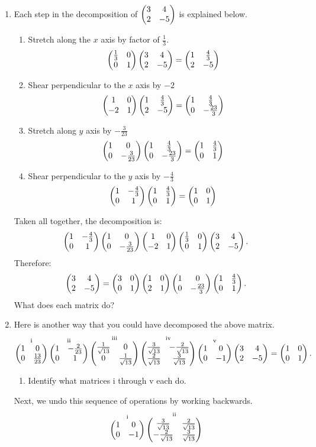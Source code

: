 \documentclass[../gatm_answers.tex]{subfiles}
\begin{document}
\begin{enumerate}
\setcounter{enumi}{\value{problem_i}}
\item \label{prob:needed_for_matrix_undo1}Each step in the decomposition of $\begin{pmatrix} 3 & 4 \\ 2 & -5 \end{pmatrix}$ is explained below.
\begin{multicols}{2}
\begin{enumerate}[label=(\roman*)]
\item Stretch along the $x$ axis by factor of $\frac{1}{3}$.
$$\begin{pmatrix} \frac{1}{3} & 0 \\ 0 & 1 \end{pmatrix}\begin{pmatrix} 3 & 4 \\ 2 & -5 \end{pmatrix}=\begin{pmatrix} 1 & \frac{4}{3} \\ 2 & -5 \end{pmatrix}$$
\item Shear perpendicular to the $x$ axis by $-2$
$$\begin{pmatrix} 1 & 0 \\ -2 & 1 \end{pmatrix}\begin{pmatrix} 1 & \frac{4}{3} \\ 2 & -5 \end{pmatrix}=\begin{pmatrix} 1 & \frac{4}{3} \\ 0 & -\frac{23}{3} \end{pmatrix}$$
\item Stretch along $y$ axis by $-\frac{3}{23}$
$$\begin{pmatrix} 1 & 0 \\ 0 & -\frac{3}{23} \end{pmatrix}\begin{pmatrix} 1 & \frac{4}{3} \\ 0 & -\frac{23}{3} \end{pmatrix}=\begin{pmatrix} 1 & \frac{4}{3} \\ 0 & 1 \end{pmatrix}$$
\item Shear perpendicular to the $y$ axis by $-\frac{4}{3}$
$$\begin{pmatrix} 1 & -\frac{4}{3} \\ 0 & 1 \end{pmatrix}\begin{pmatrix} 1 & \frac{4}{3} \\ 0 & 1 \end{pmatrix}=\begin{pmatrix} 1 & 0 \\ 0 & 1 \end{pmatrix}$$
\end{enumerate}
\end{multicols}
Taken all together, the decomposition is:
$$\begin{pmatrix} 1 & -\frac{4}{3} \\ 0 & 1 \end{pmatrix}\begin{pmatrix} 1 & 0 \\ 0 & -\frac{3}{23} \end{pmatrix}\begin{pmatrix} 1 & 0 \\ -2 & 1 \end{pmatrix}\begin{pmatrix} \frac{1}{3} & 0 \\ 0 & 1 \end{pmatrix}\begin{pmatrix} 3 & 4 \\ 2 & -5 \end{pmatrix}.$$
Therefore: $$\begin{pmatrix} 3 & 4 \\ 2 & -5 \end{pmatrix}=\begin{pmatrix} 3 & 0 \\ 0 & 1 \end{pmatrix}\begin{pmatrix} 1 & 0 \\ 2 & 1 \end{pmatrix}\begin{pmatrix} 1 & 0 \\ 0 & -\frac{23}{3} \end{pmatrix}\begin{pmatrix} 1 & \frac{4}{3} \\ 0 & 1 \end{pmatrix}.$$ What does each matrix do?
\item\label{prob:needed_for_matrix_undo2}Here is another way that you could have decomposed the above matrix.
\vspace{-2ex}
$$\mathop{\begin{pmatrix} 1 & 0 \\ 0 & \frac{13}{23} \end{pmatrix}}^{\text{i}}
\mathop{\begin{pmatrix} 1 & -\frac{2}{23} \\ 0 & 1 \end{pmatrix}}^{\text{ii}}
\mathop{\begin{pmatrix} \frac{1}{\sqrt{13}} & 0 \\ 0 & \frac{1}{\sqrt{13}} \end{pmatrix}}^{\text{iii}}
\mathop{\begin{pmatrix} \frac{3}{\sqrt{13}} & -\frac{2}{\sqrt{13}} \\ \frac{2}{\sqrt{13}} & \frac{3}{\sqrt{13}} \end{pmatrix}}^{\text{iv}}
\mathop{\begin{pmatrix} 1 & 0 \\ 0 & -1 \end{pmatrix}}^{\text{v}}
\begin{pmatrix} 3 & 4 \\ 2 & -5 \end{pmatrix}=\begin{pmatrix} 1 & 0 \\ 0 & 1 \end{pmatrix}.$$
\begin{enumerate}
\item Identify what matrices i through v each do.
\end{enumerate}
Next, we undo this sequence of operations by working backwards.
\vspace{-2ex}
$$\mathop{\begin{pmatrix} 1 & 0 \\ 0 & -1 \end{pmatrix}}^{\text{i}}
\mathop{\begin{pmatrix} \frac{3}{\sqrt{13}} & \frac{2}{\sqrt{13}} \\ -\frac{2}{\sqrt{13}} & \frac{3}{\sqrt{13}} \end{pmatrix}}^{\text{ii}}
$$
\end{enumerate}
\end{document}
